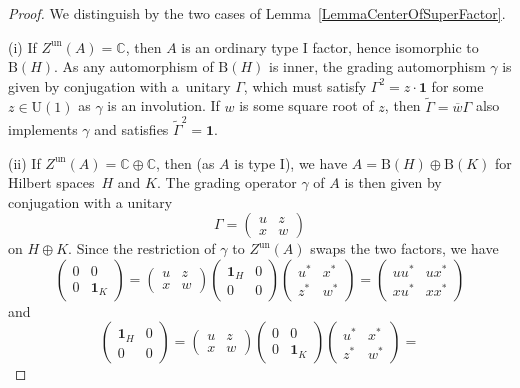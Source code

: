 \documentclass[pdftex]{sigma}
\numberwithin{equation}{section}
\newcommand{\C}{\mathbb{C}}
\newcommand{\B}{\mathrm{B}}
\newcommand{\U}{\mathrm{U}}
\begin{document}
\begin{proof}
We distinguish by the two cases of Lemma~\ref{LemmaCenterOfSuperFactor}.

(i) If $Z^{\mathrm{un}}(A) = \C$, then $A$ is an ordinary type I factor, hence isomorphic to $\B(H)$.
As any automorphism of $\B(H)$ is inner, the grading automorphism $\gamma$ is given by conjugation with a~unitary $\Gamma$, which must satisfy $\Gamma^2 = z \cdot\mathbf{1}$ for some $z \in \U(1)$ as $\gamma$ is an involution.
If $w$ is some square root of $z$, then $\tilde{\Gamma} = \overline{w} \Gamma$ also implements $\gamma$ and satisfies $\tilde{\Gamma}^2 = \mathbf{1}$.

(ii) If $Z^{\mathrm{un}}(A) = \C \oplus \C$, then (as $A$ is type I), we have $A = \B(H) \oplus \B(K)$ for Hilbert spaces~$H$ and $K$.
The grading operator $\gamma$ of $A$ is then given by conjugation with a unitary
\begin{equation*}
 \Gamma = \begin{pmatrix} u & z \\ x & w \end{pmatrix}
\end{equation*}
on $H \oplus K$.
Since the restriction of $\gamma$ to $Z^{\mathrm{un}}(A)$ swaps the two factors, we have
\begin{equation*}
\begin{pmatrix} 0 & 0 \\ 0 & \mathbf{1}_K \end{pmatrix}
 = \begin{pmatrix} u & z \\ x & w \end{pmatrix}\begin{pmatrix} \mathbf{1}_H & 0 \\ 0 & 0 \end{pmatrix}\begin{pmatrix} u^* & x^* \\ z^* & w^* \end{pmatrix} =
 \begin{pmatrix} uu^* & u x^* \\ xu^* & xx^* \end{pmatrix}
 \end{equation*}
 and
 \begin{equation*}
\begin{pmatrix} \mathbf{1}_H & 0 \\ 0 & 0 \end{pmatrix}
 = \begin{pmatrix} u & z \\ x & w \end{pmatrix}\begin{pmatrix} 0 & 0 \\ 0 & \mathbf{1}_K \end{pmatrix}\begin{pmatrix} u^* & x^* \\ z^* & w^* \end{pmatrix} =

\end{equation*}
\end{proof}
\end{document}
